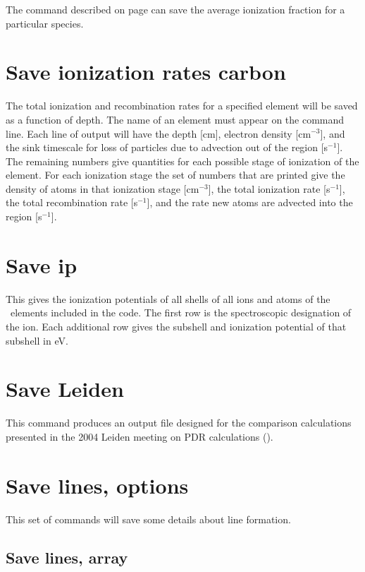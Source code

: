 The  command described on
page \pageref{sec:CommandSaveAverage} can save
the average ionization fraction for a particular species.

\section{Save ionization rates carbon}

The total ionization and recombination rates for a specified element
will be saved as a function of depth.
The name of an element must appear
on the command line.
Each line of output will have the depth [cm], electron
density [cm$^{-3}$], and the sink timescale for loss of particles due to advection
out of the region [s$^{-1}$].
The remaining numbers give quantities for each
possible stage of ionization of the element.  For each ionization stage
the set of numbers that are printed give the density of atoms in that
ionization stage [cm$^{-3}$], the total ionization rate [s$^{-1}$],
the total recombination rate [s$^{-1}$], and the rate new atoms
are advected into the region [s$^{-1}$].

\section{Save ip}

This gives the ionization potentials of all shells of all ions and atoms
of the \LIMELM\ elements included in the code.  The first row is the spectroscopic
designation of the ion.  Each additional row gives the subshell and
ionization potential of that subshell in eV.

\section{Save Leiden}

This command produces an output file designed for the comparison
calculations presented in the 2004 Leiden meeting on PDR calculations
(\citealp{Roellig2007}).

\section{Save lines, options}

This set of commands will save some details about line formation.

\subsection{Save lines, array}

